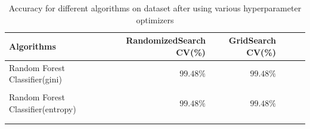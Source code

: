 \documentclass{article}
\begin{document}
\begin{table}[ht]
  \centering
  \caption{Accuracy for different algorithms on dataset after using various hyperparameter optimizers}
  \label{hyperp} 
  \vspace{\baselineskip}
  \begin{tabular}{lrrrrr}
  \toprule
  Algorithms & RandomizedSearch CV(\%) & GridSearch CV(\%)\\
  \midrule
  Random Forest Classifier(gini) & $99.48\%$ & $99.48\%$ \\\\ \hline \addlinespace
  Random Forest Classifier(entropy) & $99.48\%$ & $99.48\%$ \\\\ \hline \addlinespace
  \end{tabular}
\end{table}
\end{document}
